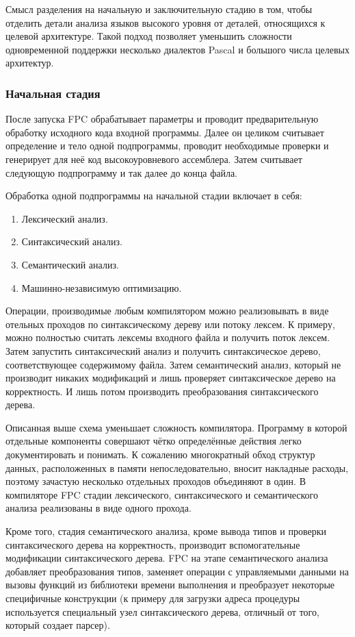 \documentclass{imcs}
\begin{document}
Смысл разделения на начальную и заключительную стадию в
том, чтобы отделить детали анализа языков высокого уровня от деталей,
относящихся к целевой архитектуре. Такой подход позволяет уменьшить сложности
одновременной поддержки несколько диалектов Pascal и большого числа целевых
архитектур.

\subsubsection{Начальная стадия}

После запуска FPC обрабатывает параметры и проводит предварительную обработку
исходного кода входной программы. Далее он целиком считывает определение и тело
одной подпрограммы, проводит необходимые проверки и генерирует для неё
код высокоуровневого ассемблера. Затем считывает следующую подпрограмму и так далее
до конца файла.

Обработка одной подпрограммы на начальной стадии включает в себя:
\begin{enumerate}
    \item Лексический анализ.
    \item Синтаксический анализ.
    \item Семантический анализ.
    \item Машинно-независимую оптимизацию.
\end{enumerate}

Операции, производимые любым компилятором можно реализовывать в виде
отельных проходов по синтаксическому дереву или потоку лексем. К примеру, можно
полностью считать лексемы входного файла и получить поток лексем. Затем запустить
синтаксический анализ и получить синтаксическое дерево, соответствующее содержимому
файла. Затем семантический анализ, который не производит никаких модификаций и 
лишь проверяет синтаксическое дерево на корректность. И лишь потом производить
преобразования синтаксического дерева.

Описанная выше схема уменьшает сложность компилятора. Программу в которой отдельные 
компоненты совершают чётко определённые действия легко документировать и понимать.
К сожалению многократный обход структур данных, расположенных в памяти непоследовательно,
вносит накладные расходы\cite{kaspersky}, поэтому
зачастую несколько отдельных проходов объединяют в один. В компиляторе FPC стадии
лексического, синтаксического и семантического анализа реализованы в виде одного
прохода. 

Кроме того, стадия семантического анализа, кроме вывода типов и проверки синтаксического
дерева на корректность, производит вспомогательные модификации синтаксического дерева.
FPC на этапе семантического анализа добавляет преобразования типов, заменяет операции
с управляемыми данными на вызовы функций из библиотеки времени выполнения и преобразует
некоторые специфичные конструкции (к примеру для загрузки адреса процедуры используется
специальный узел синтаксического дерева, отличный от того, который создает парсер).
\end{document}

